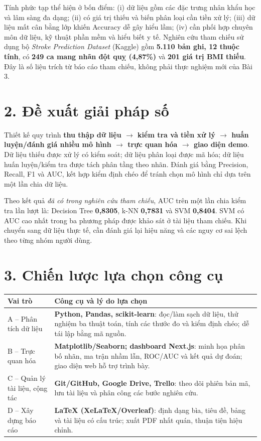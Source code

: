 \documentclass[12pt,a4paper]{article}
\begin{document}
Tính phức tạp thể hiện ở bốn điểm: (i) dữ liệu gồm các đặc trưng nhân khẩu học và lâm sàng đa dạng; (ii) có giá trị thiếu và biến phân loại cần tiền xử lý; (iii) dữ liệu mất cân bằng lớp khiến Accuracy dễ gây hiểu lầm; (iv) cần phối hợp chuyên môn dữ liệu, kỹ thuật phần mềm và hiểu biết y tế. Nghiên cứu tham chiếu sử dụng bộ \textit{Stroke Prediction Dataset} (Kaggle) gồm \textbf{5.110 bản ghi, 12 thuộc tính}, có \textbf{249 ca mang nhãn đột quỵ (4,87\%)} và \textbf{201 giá trị BMI thiếu}. Đây là số liệu trích từ báo cáo tham chiếu, không phải thực nghiệm mới của Bài 3.

\section*{2. Đề xuất giải pháp số}
Thiết kế quy trình \textbf{thu thập dữ liệu $\rightarrow$ kiểm tra và tiền xử lý $\rightarrow$ huấn luyện/đánh giá nhiều mô hình $\rightarrow$ trực quan hóa $\rightarrow$ giao diện demo}. Dữ liệu thiếu được xử lý có kiểm soát; dữ liệu phân loại được mã hóa; dữ liệu huấn luyện/kiểm tra được tách phân tầng theo nhãn. Đánh giá bằng Precision, Recall, F1 và AUC, kết hợp kiểm định chéo để tránh chọn mô hình chỉ dựa trên một lần chia dữ liệu.

Theo kết quả \textit{đã có trong nghiên cứu tham chiếu}, AUC trên một lần chia kiểm tra lần lượt là: Decision Tree \textbf{0,8305}, k-NN \textbf{0,7831} và SVM \textbf{0,8404}. SVM có AUC cao nhất trong ba phương pháp được khảo sát ở tài liệu tham chiếu. Khi chuyển sang dữ liệu thực tế, cần đánh giá lại hiệu năng và các nguy cơ sai lệch theo từng nhóm người dùng.

\section*{3. Chiến lược lựa chọn công cụ}
\renewcommand{\arraystretch}{1.14}
\begin{tabularx}{\textwidth}{|>{\raggedright\arraybackslash}p{3.2cm}|X|}
\hline
\textbf{Vai trò} & \textbf{Công cụ và lý do lựa chọn}\\\hline
A -- Phân tích dữ liệu & \textbf{Python, Pandas, scikit-learn}: đọc/làm sạch dữ liệu, thử nghiệm ba thuật toán, tính các thước đo và kiểm định chéo; dễ tái lập bằng mã nguồn.\\\hline
B -- Trực quan hóa & \textbf{Matplotlib/Seaborn; dashboard Next.js}: minh họa phân bố nhãn, ma trận nhầm lẫn, ROC/AUC và kết quả dự đoán; giao diện web hỗ trợ trình bày.\\\hline
C -- Quản lý tài liệu, cộng tác & \textbf{Git/GitHub, Google Drive, Trello}: theo dõi phiên bản mã, lưu tài liệu và phân công các bước nghiên cứu.\\\hline
D -- Xây dựng báo cáo & \textbf{LaTeX (XeLaTeX/Overleaf)}: định dạng bìa, tiêu đề, bảng và tài liệu có cấu trúc; xuất PDF nhất quán, thuận tiện hiệu chỉnh.\\\hline
\end{tabularx}
\end{document}
